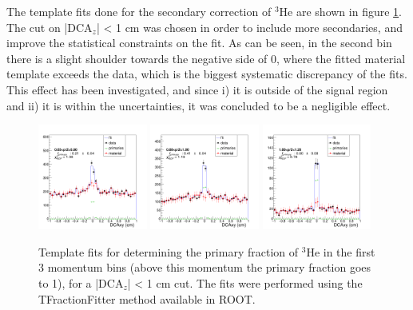 The template fits done for the secondary correction of $^3\mathrm{He}$ are shown in figure \ref{fig:Template_fits_he}. The cut on |DCA$_z$| < 1 cm was chosen in order to include more secondaries, and improve the statistical constraints on the fit. As can be seen, in the second bin there is a slight shoulder towards the negative side of 0, where the fitted material template exceeds the data, which is the biggest systematic discrepancy of the fits. This effect has been investigated, and since i) it is outside of the signal region and ii) it is within the uncertainties, it was concluded to be a negligible effect. 

\begin{figure}
    \centering
    \includegraphics[width=0.32\textwidth]{figures/TemplateFitHe3_0.65<p<0.8_rebin_5.png}
    \includegraphics[width=0.32\textwidth]{figures/TemplateFitHe3_0.8<p<1_rebin_5.png}
    \includegraphics[width=0.32\textwidth]{figures/TemplateFitHe3_1<p<1.2_rebin_5.png}
    \caption{Template fits for determining the primary fraction of $^3\mathrm{He}$ in the first 3 momentum bins (above this momentum the primary fraction goes to 1), for a |DCA$_z$| < 1 cm cut. The fits were performed using the TFractionFitter method available in ROOT.}
    \label{fig:Template_fits_he}
\end{figure}

